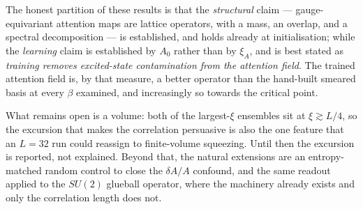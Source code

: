 \documentclass[11pt,a4paper]{article}
\newcommand{\xiA}{\xi_A}
\begin{document}
The honest partition of these results is that the \emph{structural} claim
--- gauge-equivariant attention maps are lattice operators, with a mass, an
overlap, and a spectral decomposition --- is established, and holds already at
initialisation; while the \emph{learning} claim is established by $A_0$ rather
than by $\xiA$, and is best stated as \emph{training removes excited-state
contamination from the attention field}. The trained attention field is, by that
measure, a better operator than the hand-built smeared basis at every $\beta$
examined, and increasingly so towards the critical point.

What remains open is a volume: both of the largest-$\xi$ ensembles sit at
$\xi \gtrsim L/4$, so the excursion that makes the correlation persuasive is
also the one feature that an $L=32$ run could reassign to finite-volume
squeezing. Until then the excursion is reported, not explained. Beyond that, the
natural extensions are an entropy-matched random control to close the
$\delta A/A$ confound, and the same readout applied to the $SU(2)$ glueball
operator, where the machinery already exists and only the correlation length
does not.
\end{document}
